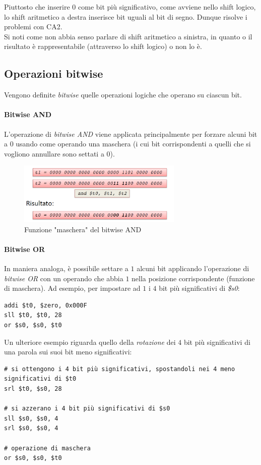 \documentclass[class=book, crop=false]{standalone}
\begin{document}
Piuttosto che inserire 0 come bit più significativo, come avviene nello shift logico, lo shift aritmetico a destra inserisce bit uguali al bit di segno. Dunque risolve i problemi con CA2.\\
Si noti come non abbia senso parlare di shift aritmetico a sinistra, in quanto o il risultato è rappresentabile (attraverso lo shift logico) o non lo è.

\subsection{Operazioni bitwise}
Vengono definite \emph{bitwise} quelle operazioni logiche che operano su ciascun bit.

\paragraph{Bitwise AND}
L'operazione di \emph{bitwise AND} viene applicata principalmente per forzare alcuni bit a 0 usando come operando una maschera (i cui bit corrispondenti a quelli che si vogliono annullare sono settati a 0).
\begin{figure}[H]
	\centering
	\includegraphics[width=0.7\textwidth,keepaspectratio]{bitwise_and}
	\caption{Funzione "maschera" del bitwise AND}
\end{figure}

\paragraph{Bitwise OR}
In maniera analoga, è possibile settare a \(1\) alcuni bit applicando l'operazione di \emph{bitwise OR} con un operando che abbia \(1\) nella posizione corrispondente (funzione di maschera). Ad esempio, per impostare ad \(1\) i \(4\) bit più significativi di \emph{\$s0}:
\begin{verbatim}
addi $t0, $zero, 0x000F
sll $t0, $t0, 28
or $s0, $s0, $t0
\end{verbatim}

Un ulteriore esempio riguarda quello della \emph{rotazione} dei \(4\) bit più significativi di una parola sui suoi bit meno significativi:
\begin{verbatim}
# si ottengono i 4 bit più significativi, spostandoli nei 4 meno significativi di $t0
srl $t0, $s0, 28

# si azzerano i 4 bit più significativi di $s0
sll $s0, $s0, 4
srl $s0, $s0, 4

# operazione di maschera
or $s0, $s0, $t0
\end{verbatim}
\end{document}
